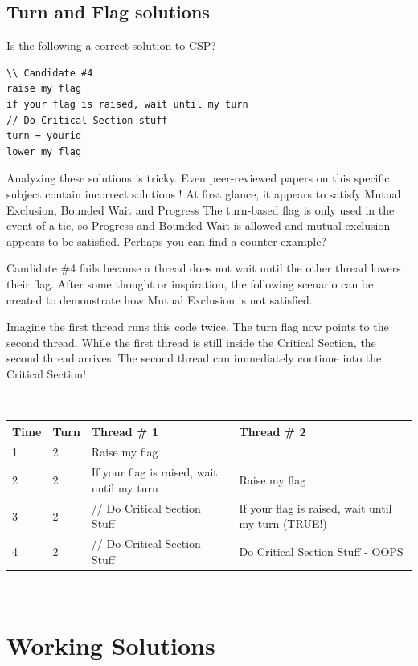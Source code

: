 \subsection{Turn and Flag solutions}

Is the following a correct solution to CSP?

\begin{lstlisting}
\\ Candidate #4
raise my flag
if your flag is raised, wait until my turn
// Do Critical Section stuff
turn = yourid
lower my flag
\end{lstlisting}

Analyzing these solutions is tricky.
Even peer-reviewed papers on this specific subject contain incorrect solutions \cite{Hyman:1966:CPC:365153.365167}!
At first glance, it appears to satisfy Mutual Exclusion, Bounded Wait and Progress
The turn-based flag is only used in the event of a tie, so Progress and Bounded Wait is allowed and mutual exclusion appears to be satisfied.
Perhaps you can find a counter-example?

Candidate \#4 fails because a thread does not wait until the other thread lowers their flag.
After some thought or inspiration, the following scenario can be created to demonstrate how Mutual Exclusion is not satisfied.

Imagine the first thread runs this code twice.
The turn flag now points to the second thread.
While the first thread is still inside the Critical Section, the second thread arrives.
The second thread can immediately continue into the Critical Section!

\\
\begin{center}
\begin{tabular}{|l|l|l|l|}
Time & Turn & Thread \# 1 & Thread \# 2 \\ \hline
1 & 2 & Raise my flag & \\
2 & 2 & If your flag is raised, wait until my turn & Raise my flag \\
3 & 2 & // Do Critical Section Stuff & If your flag is raised, wait until my turn (TRUE!) \\
4 & 2 & // Do Critical Section Stuff & Do Critical Section Stuff - OOPS \\
\end{tabular}
\end{center}
\\

\section{Working Solutions}


